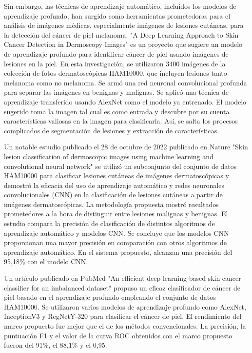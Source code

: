 Sin embargo, las técnicas de aprendizaje automático, incluidos los modelos de aprendizaje profundo, han surgido como herramientas prometedoras para el análisis 
de imágenes médicas, especialmente imágenes de lesiones cutáneas, para la detección del cáncer de piel melanoma. "A Deep Learning Approach to Skin Cancer Detection in Dermoscopy Images" %
es un proyecto que sugiere un modelo de aprendizaje profundo para identificar cáncer de piel usando imágenes de lesiones en la piel. En esta investigación, se utilizaron 3400 imágenes de la colección de fotos dermatoscópicas HAM10000, que incluyen lesiones tanto melanoma como no melanoma. Se armó una red neuronal convolucional profunda para separar las imágenes en benignas y malignas. Se aplicó una técnica de aprendizaje transferido usando AlexNet como el modelo ya entrenado. El modelo sugerido toma la imagen tal cual es como entrada y descubre por su cuenta características valiosas en la imagen para clasificarla. Así, se salta los procesos complicados de segmentación de lesiones y extracción de características.

Un notable estudio publicado el 28 de octubre de 2022 publicado en Nature "Skin lesion classification of dermoscopic images using machine learning and convolutional neural network" %
se utilizó un subconjunto del conjunto de datos HAM10000 para clasificar lesiones cutáneas de imágenes dermatoscópicas y demostró la eficacia del uso de aprendizaje automático y redes neuronales convolucionales (CNN) en la clasificación de lesiones cutáneas a partir de imágenes dermatoscópicas. 
La metodología propuesta mostró resultados prometedores a la hora de distinguir entre lesiones malignas y benignas. El estudio compara la precisión de clasificación de distintos algoritmos de aprendizaje automático y modelos CNN. Se concluye que los modelos CNN proporcionan una mayor precisión en comparación con otros algoritmos de aprendizaje automático. En el sistema propuesto, alcanzan una precisión del 95,18\% con el modelo CNN.


Un artículo publicado en PubMed "An efficient deep learning-based skin cancer classifier for an imbalanced dataset" %
propuso un eficaz clasificador de cáncer de piel basado en el aprendizaje profundo empleando el conjunto de datos HAM10000. Se utilizaron varios modelos de aprendizaje profundo como AlexNet, InceptionV3 y RegNetY-320 para clasificar el cáncer de piel. El rendimiento del marco propuesto fue mejor que el de los métodos convencionales. La precisión, la puntuación F1 y el valor de la curva ROC obtenidos con el marco propuesto fueron del 91\%, el 88,1\% y el 0,95. 

